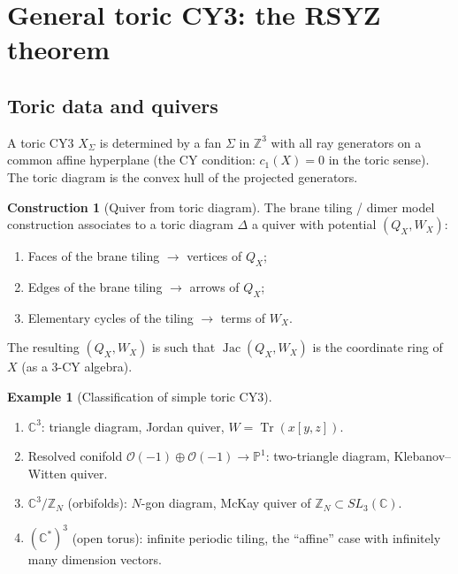 \documentclass[11pt]{article}
\theoremstyle{definition}
\newtheorem{example}[theorem]{Example}
\newtheorem{construction}[theorem]{Construction}
\theoremstyle{remark}
\newcommand{\ZZ}{\mathbb{Z}}
\newcommand{\CC}{\mathbb{C}}
\newcommand{\Tr}{\operatorname{Tr}}
\newcommand{\cO}{\mathcal{O}}
\begin{document}
\section{General toric CY3: the RSYZ theorem}
\label{sec:rsyz}

\subsection{Toric data and quivers}
\label{subsec:toric-data}

A toric CY3 $X_\Sigma$ is determined by a fan $\Sigma$ in $\ZZ^3$ with all
ray generators on a common affine hyperplane (the CY condition: $c_1(X) = 0$
in the toric sense). The toric diagram is the convex hull of the projected
generators.

\begin{construction}[Quiver from toric diagram]
\label{constr:quiver-toric}
The brane tiling / dimer model construction associates to a toric diagram
$\Delta$ a quiver with potential $(Q_X, W_X)$:
\begin{enumerate}[label=(\roman*)]
 \item Faces of the brane tiling $\to$ vertices of $Q_X$;
 \item Edges of the brane tiling $\to$ arrows of $Q_X$;
 \item Elementary cycles of the tiling $\to$ terms of $W_X$.
\end{enumerate}
The resulting $(Q_X, W_X)$ is such that $\operatorname{Jac}(Q_X, W_X)$ is the
coordinate ring of $X$ (as a 3-CY algebra).
\end{construction}

\begin{example}[Classification of simple toric CY3]
\label{ex:toric-classification}
\leavevmode
\begin{enumerate}[label=(\alph*)]
 \item $\CC^3$: triangle diagram, Jordan quiver, $W = \Tr(x[y,z])$.
 \item Resolved conifold $\cO(-1) \oplus \cO(-1) \to \mathbb{P}^1$:
 two-triangle diagram, Klebanov--Witten quiver.
 \item $\CC^3/\ZZ_N$ (orbifolds): $N$-gon diagram, McKay quiver of
 $\ZZ_N \subset SL_3(\CC)$.
 \item $(\CC^*)^3$ (open torus): infinite periodic tiling, the ``affine''
 case with infinitely many dimension vectors.
\end{enumerate}
\end{example}
\end{document}

